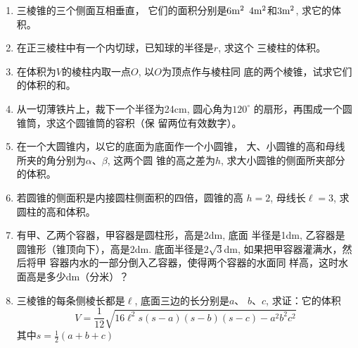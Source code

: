 \begin{enumerate}
    \item 三棱锥的三个侧面互相垂直，
    它们的面积分别是$6{\rm m^2}$
    $4{\rm m^2}$和$3{\rm m^2}$, 求它的体积。
    \item 在正三棱柱中有一个内切球，已知球的半径是$r$, 求这个
    三棱柱的体积。
    \item 在体积为$V$的棱柱内取一点$O$, 以$O$为顶点作与棱柱同
    底的两个棱锥，试求它们的体积的和。
    \item 从一切薄铁片上，裁下一个半径为24cm, 圆心角为$120^{\circ}$
    的扇形，再围成一个圆锥筒，求这个圆锥筒的容积（保
    留两位有效数字）。
    \item 在一个大圆锥内，以它的底面为底面作一个小圆锥，
    大、小圆锥的高和母线所夹的角分别为$\alpha$、$\beta$, 这两个圆
    锥的高之差为$h$, 求大小圆锥的侧面所夹部分的体积。
    \item 若圆锥的侧面积是内接圆柱侧面积的四倍，圆锥的高
    $h=2$, 母线长$\ell =3$, 求圆柱的高和体积。
    \item 有甲、乙两个容器，甲容器是圆柱形，高是2dm, 底面
    半径是1dm, 乙容器是圆锥形（锥顶向下），高是2dm.
    底面半径是$2\sqrt{3}$dm, 如果把甲容器灌满水，然后将甲
    容器内水的一部分倒入乙容器，使得两个容器的水面同
    样高，这时水面高是多少dm（分米）？
\item 三棱锥的每条侧棱长都是$\ell$, 底面三边的长分别是$a$、
$b$、$c$, 求证：它的体积
\[V=\frac{1}{12}\sqrt{16\ell^2 s(s-a)(s-b)(s-c)-a^2b^2c^2}\]
其中$s=\frac{1}{2}(a+b+c)$


\end{enumerate}
